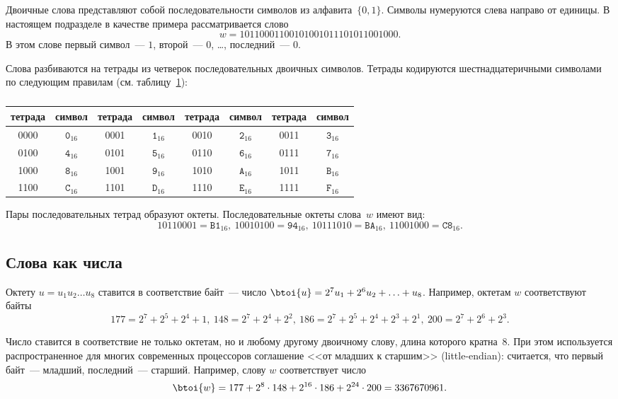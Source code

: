 Двоичные слова представляют собой последовательности символов из 
алфавита~$\{0,1\}$. Символы нумеруются слева направо от единицы.
%
В настоящем подразделе в качестве примера рассматривается слово
$$
w=1011 0001 1001 0100 1011 1010 1100 1000.
$$
В этом слове первый символ~--- $1$, 
второй~--- $0$, \ldots, последний~--- $0$.

Слова разбиваются на тетрады из четверок последовательных двоичных символов.
%
Тетрады кодируются шестнадцатеричными символами по следующим правилам
(см. таблицу~\ref{Table.Hex}):

\begin{table}[H]
\caption{}\label{Table.Hex}
\begin{tabular}{|c|c||c|c||c|c||c|c|}
\hline
тетрада & символ & тетрада & символ & тетрада & символ & тетрада & символ\\
\hline
\hline
0000 & $\texttt{0}_{16}$ & 0001 & $\texttt{1}_{16}$ & 
0010 & $\texttt{2}_{16}$ & 0011 & $\texttt{3}_{16}$\\
0100 & $\texttt{4}_{16}$ & 0101 & $\texttt{5}_{16}$ & 
0110 & $\texttt{6}_{16}$ & 0111 & $\texttt{7}_{16}$\\ 
1000 & $\texttt{8}_{16}$ & 1001 & $\texttt{9}_{16}$ & 
1010 & $\texttt{A}_{16}$ & 1011 & $\texttt{B}_{16}$\\ 
1100 & $\texttt{C}_{16}$ & 1101 & $\texttt{D}_{16}$ & 
1110 & $\texttt{E}_{16}$ & 1111 & $\texttt{F}_{16}$\\ 
\hline
\end{tabular}
\end{table}

Пары последовательных тетрад образуют октеты.
Последовательные октеты слова~$w$ имеют вид:
$$
1011 0001=\texttt{B1}_{16},\ 
1001 0100=\texttt{94}_{16},\ 
1011 1010=\texttt{BA}_{16},\  
1100 1000=\texttt{C8}_{16}.
$$

\subsection{Слова как числа}\label{DEFS.Btoi}

Октету $u=u_1 u_2\ldots u_8$ ставится в соответствие байт~--- 
число $\btoi{u}=2^7u_1+2^6 u_2+\ldots + u_8$. 
Например, октетам $w$ соответствуют байты
$$
177=2^7+2^5+2^4+1,\ 
148=2^7+2^4+2^2,\ 
186=2^7+2^5+2^4+2^3+2^1,\ 
200=2^7+2^6+2^3.
$$

Число ставится в соответствие не только октетам, но и любому другому
двоичному слову, длина которого кратна~$8$. 
%
При этом используется распространенное для многих современных 
процессоров соглашение <<от младших к старшим>> (little-endian):
считается, что первый байт~--- младший, последний~--- старший.
Например, слову $w$ соответствует число
$$
\btoi{w}=177+2^{8}\cdot 148+2^{16}\cdot 186+2^{24}\cdot 200 = 3367670961.
$$

